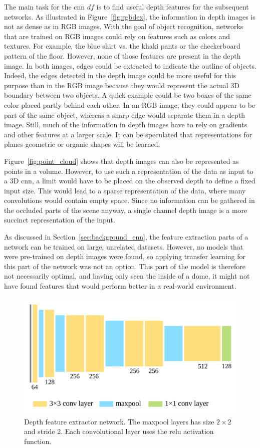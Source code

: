 The main task for the \gls{cnn} $df$ is to find useful depth features for the subsequent networks. As illustrated in Figure~\ref{fig:rgbdex}, the information in depth images is not as dense as in RGB images. With the goal of object recognition, networks that are trained on RGB images could rely on features such as colors and textures. For example, the blue shirt vs. the khaki pants or the checkerboard pattern of the floor. However, none of those features are present in the depth image. In both images, edges could be extracted to indicate the outline of objects. Indeed, the edges detected in the depth image could be more useful for this purpose than in the RGB image because they would represent the actual 3D boundary between two objects. A quick example could be two boxes of the same color placed partly behind each other. In an RGB image, they could appear to be part of the same object, whereas a sharp edge would separate them in a depth image. Still, much of the information in depth images have to rely on gradients and other features at a larger scale. It can be speculated that representations for planes geometric or organic shapes will be learned.

Figure~\ref{fig:point_cloud} shows that depth images can also be represented as points in a volume. However, to use such a representation of the data as input to a 3D \gls{cnn}, a limit would have to be placed on the observed depth to define a fixed input size. This would lead to a sparse representation of the data, where many convolutions would contain empty space. Since no information can be gathered in the occluded parts of the scene anyway, a single channel depth image is a more succinct representation of the input.

As discussed in Section~\ref{sec:background_cnn}, the feature extraction parts of a network can be trained on large, unrelated datasets. However, no models that were pre-trained on depth images were found, so applying transfer learning for this part of the network was not an option. This part of the model is therefore not necessarily optimal, and having only seen the inside of a dome, it might not have found features that would perform better in a real-world environment.

\begin{figure}[h]
  \centering
  \includegraphics[width=.7\textwidth]{img/convvgg}
  \caption[Depth Feature Extraction]{Depth feature extractor network. The maxpool layers has size $2 \times 2$ and stride 2. Each convolutional layer uses the \gls{relu} activation function.}
  \label{fig:depth_feature_network}
\end{figure}

